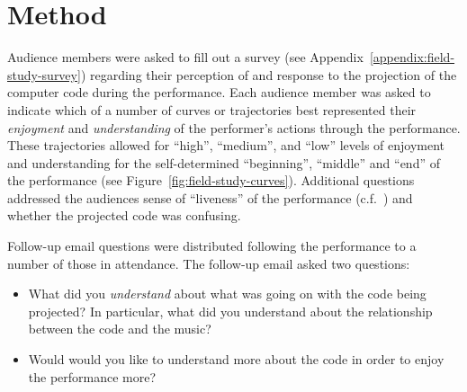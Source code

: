\section{Method}

Audience members were asked to fill out a survey (see Appendix~\ref{appendix:field-study-survey}) regarding their perception of and response to the projection of the computer code during the performance. Each audience member was asked to indicate which of a number of curves or trajectories best represented their \emph{enjoyment} and \emph{understanding} of the performer's actions through the performance. These trajectories allowed for ``high'', ``medium'', and ``low'' levels of enjoyment and understanding for the self-determined ``beginning'', ``middle'' and ``end'' of the performance (see Figure~\ref{fig:field-study-curves}). Additional questions addressed the audiences sense of ``liveness'' of the performance (c.f.~\cite{Auslander}) and whether the projected code was confusing.

Follow-up email questions were distributed following the performance to a number of those in attendance. The follow-up email asked two questions: 
\begin{itemize}
\item What did you \emph{understand} about what was going on with the code being projected? In particular, what did you understand about the relationship between the code and the music? 
\item Would would you like to understand more about the code in order to enjoy the performance more? 
\end{itemize}

